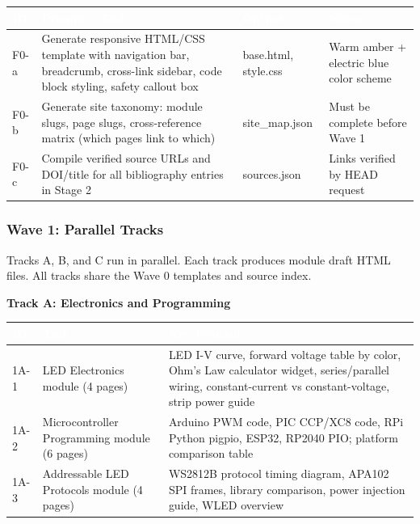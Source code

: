 \documentclass[11pt,letterpaper]{article}
\newcommand{\tableheader}[1]{\textbf{\sffamily\textcolor{white}{#1}}}
\begin{document}
\begin{center}
\begin{tabularx}{\textwidth}{L{2cm}XL{2cm}L{2.5cm}}
\toprule
{}
\tableheader{ID} & \tableheader{Prompt / Task} & \tableheader{Output} & \tableheader{Notes} \\
\midrule
F0-a & Generate responsive HTML/CSS template with navigation bar, breadcrumb, cross-link sidebar, code block styling, safety callout box & base.html, style.css & Warm amber + electric blue color scheme \\
F0-b & Generate site taxonomy: module slugs, page slugs, cross-reference matrix (which pages link to which) & site\_map.json & Must be complete before Wave 1 \\
F0-c & Compile verified source URLs and DOI/title for all bibliography entries in Stage 2 & sources.json & Links verified by HEAD request \\
\bottomrule
\end{tabularx}
\end{center}

\subsubsection{Wave 1: Parallel Tracks}

Tracks A, B, and C run in parallel. Each track produces module draft HTML files. All tracks share the Wave 0 templates and source index.

\textbf{Track A: Electronics and Programming}

\begin{center}
\begin{tabularx}{\textwidth}{L{2cm}XL{3cm}}
\toprule
{}
\tableheader{ID} & \tableheader{Task} & \tableheader{Key Content} \\
\midrule
1A-1 & LED Electronics module (4 pages) & LED I-V curve, forward voltage table by color, Ohm's Law calculator widget, series/parallel wiring, constant-current vs constant-voltage, strip power guide \\
1A-2 & Microcontroller Programming module (6 pages) & Arduino PWM code, PIC CCP/XC8 code, RPi Python pigpio, ESP32, RP2040 PIO; platform comparison table \\
1A-3 & Addressable LED Protocols module (4 pages) & WS2812B protocol timing diagram, APA102 SPI frames, library comparison, power injection guide, WLED overview \\
\bottomrule
\end{tabularx}
\end{center}
\end{document}
